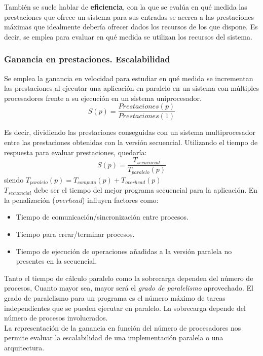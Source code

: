 \documentclass[12pt,spanish]{article}
\begin{document}
También se suele hablar de \textbf{eficiencia}, con la que se evalúa en qué medida las prestaciones que ofrece un sistema para sus entradas se acerca a las prestaciones máximas que idealmente debería ofrecer dados los recursos de los que dispone. Es decir, se emplea para evaluar en qué medida se utilizan los recursos del sistema.


\subsubsection{Ganancia en prestaciones. Escalabilidad}

Se emplea la ganancia en velocidad para estudiar en qué medida se incrementan las prestaciones al ejecutar una aplicación en paralelo en un sistema con múltiples procesadores frente a su ejecución en un sistema uniprocesador.
\begin{equation}
	S(p)=\frac{Prestaciones(p)}{Prestaciones(1)}
\end{equation}

Es decir, dividiendo las prestaciones conseguidas con un sistema multiprocesador entre las prestaciones obtenidas con la versión secuencial. Utilizando el tiempo de respuesta para evaluar prestaciones, quedaría:
\begin{equation}
S(p)=\frac{T_{secuencial}}{T_{paralelo}(p)}
\end{equation}
siendo $T_{paralelo}(p)=T_{computo}(p)+T_{overhead}(p)$\\
$T_{secuencial}$ debe ser el tiempo del mejor programa secuencial para la aplicación. En la penalización (\textit{overhead}) influyen factores como:
\begin{itemize}
	\item Tiempo de comunicación/sincronización entre procesos.
	\item Tiempo para crear/terminar procesos.
	\item Tiempo de ejecución de operaciones añadidas a la versión paralela no presentes en la secuencial.
\end{itemize}


Tanto el tiempo de cálculo paralelo como la sobrecarga dependen del número de procesos, Cuanto mayor sea, mayor será el \textit{grado de paralelismo} aprovechado. El grado de paralelismo para un programa es el número máximo de tareas independientes que se pueden ejecutar en paralelo. La sobrecarga depende del número de procesos involucrados.\\

La representación de la ganancia en función del número de procesadores nos permite evaluar la escalabilidad de una implementación paralela o una arquitectura.
\end{document}
